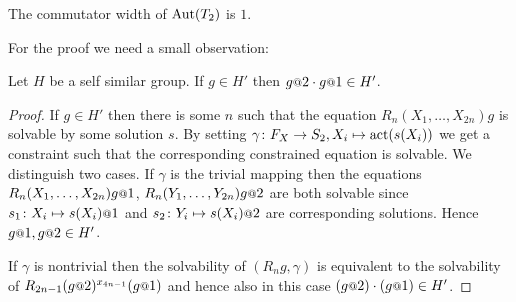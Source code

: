 \documentclass[a4paper,11pt]{amsart}
\begin{document}
\begin{pro}\label{pro:comwidthAutT2}
 The commutator width of $\operatorname{{Aut}}(T_2)$ is $1$.
\end{pro}
For the proof we need a small observation:
\begin{lem}\label{lem:H'}
  Let $H$ be a self similar group.
  If $g\in H'$ then $g\at{2}\cdot g\at{1}\in H'$. 
\end{lem}
  \begin{proof}
 If $g\in H'$ then there is some $n$ such that the equation $R_n(X_1,\ldots,X_{2n})g$ is 
 solvable by some solution $s$. By setting $\gamma\colon F_X\to S_2, X_i\mapsto \operatorname{act}(s(X_i))$
 we get a constraint such that the corresponding constrained equation is solvable. 
 We distinguish two cases. If $\gamma$ is the trivial mapping 
 then the equations $R_n(X_1,\ldots,X_{2n})g\at{1}$,
 $R_n(Y_1,\ldots,Y_{2n})g\at{2}$ are both solvable since
 $s_1\colon X_i \mapsto s(X_i)\at{1}$ and $s_2\colon Y_i\mapsto s(X_i)\at{2}$ are 
 corresponding solutions. Hence $g\at{1},g\at{2} \in H'$. 
 
 If $\gamma$ is nontrivial then the solvability of $(R_ng,\gamma)$ is equivalent 
 to the solvability of $R_{2n-1}(g\at{2})^{x_{4n-1}}(g\at{1})$ and hence 
 also in this case $(g\at{2})\cdot(g\at{1})\in H'$.
\end{proof}
\end{document}
